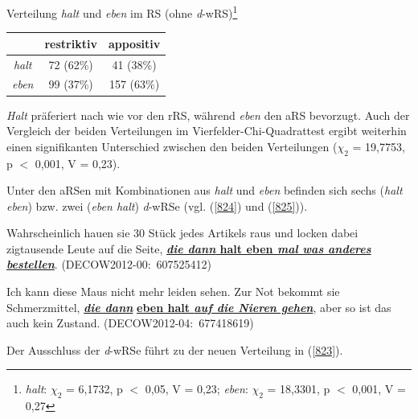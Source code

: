 \begin{exe}
	\ex\label{823} Verteilung \textit{halt} und \textit{eben} im RS (ohne \textit{d}-wRS)\footnote{\textit{halt}: $				\chi_{2}$ = 6,1732, p $<$ 0,05, V = 0,23; \textit{eben}: $\chi_{2}$ = 18,3301, p $<$ 0,001, V = 0,27}\\[-1em]
     \begin{tabular}[t]{|c|c|c|}
     \hline
	 {} & restriktiv & appositiv\\
	 \hline
	 \textit{halt} & 72 (62\%) & 41 (38\%)\\
	 \hline	 
	 \textit{eben} & 99 (37\%) & 157 (63\%)\\
	 \hline    
     \end{tabular}
\end{exe}    
\textit{Halt} präferiert nach wie vor den rRS, während \textit{eben} den aRS bevorzugt. Auch der Vergleich der beiden Verteilungen im Vierfelder-Chi-Quadrattest ergibt wei\-terhin einen signifikanten Unterschied zwischen den beiden Verteilungen ($\chi_{2}$ = 19,7753, p $<$ 0,001, V = 0,23).

Unter den aRSen mit Kombinationen aus \textit{halt} und \textit{eben} befinden sich sechs (\textit{halt eben}) bzw. zwei (\textit{eben halt}) \textit{d}-wRSe (vgl. (\ref{824}) und (\ref{825})).

\begin{exe}
	\ex\label{824} 
	\scriptsize
	Wahrscheinlich hauen sie 30 Stück jedes Artikels raus und locken dabei zigtausende Leute auf die Seite, 							\underline{\textbf{\textit{die dann} halt eben \textit{mal was anderes bestellen}}}.  
	\hfill\hbox{(DECOW2012-00: 607525412)}
\end{exe} 

\begin{exe}
	\ex\label{825} 
	\scriptsize
	Ich kann diese Maus nicht mehr leiden sehen. Zur Not bekommt sie Schmerzmittel, \underline{\textbf{\textit{die dann}}} 			\underline{\textbf{eben halt \textit{auf die Nieren gehen}}}, aber so ist das auch kein Zustand.  		
	\hfill\hbox{(DECOW2012-04: 677418619)}
\end{exe}  	                                                                                     
Der Ausschluss der \textit{d}-wRSe führt zu der neuen Verteilung in (\ref{823}).

